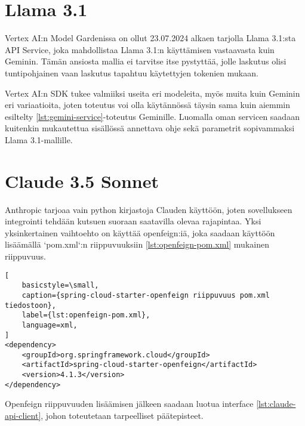 

\section{Llama 3.1}

Vertex AI:n Model Gardenissa on ollut 23.07.2024 alkaen tarjolla Llama 3.1:sta
API Service, joka mahdollistaa Llama 3.1:n käyttämisen vastaavasta kuin
Geminin. Tämän ansiosta mallia ei tarvitse itse pystyttää, jolle laskutus olisi
tuntipohjainen vaan laskutus tapahtuu käytettyjen tokenien mukaan.
\parencite{vertexAiModelGardenLlama3}

Vertex AI:n SDK tukee valmiiksi useita eri modeleita, myös muita kuin Geminin
eri variaatioita, joten toteutus voi olla käytännössä täysin sama kuin aiemmin
esiltelty \ref{lst:gemini-service}-toteutus Geminille. Luomalla oman servicen
saadaan kuitenkin mukautettua sisällössä annettava ohje sekä parametrit
sopivammaksi Llama 3.1-mallille.

\section{Claude 3.5 Sonnet}

Anthropic tarjoaa vain python kirjastoja Clauden käyttöön, joten sovellukseen
integrointi tehdään kutsuen suoraan saatavilla olevaa rajapintaa. Yksi
yksinkertainen vaihtoehto on käyttää openfeign:iä, joka saadaan käyttöön
lisäämällä `pom.xml`:n riippuvuuksiin \ref{lst:openfeign-pom.xml} mukainen
riippuvuus.

\begin{lstlisting}[
    basicstyle=\small,
    caption={spring-cloud-starter-openfeign riippuvuus pom.xml tiedostoon},
    label={lst:openfeign-pom.xml},
    language=xml,
]
<dependency>
    <groupId>org.springframework.cloud</groupId>
    <artifactId>spring-cloud-starter-openfeign</artifactId>
    <version>4.1.3</version>
</dependency>
\end{lstlisting}

Openfeign riippuvuuden lisäämisen jälkeen saadaan luotua interface
\ref{lst:claude-api-client}, johon toteutetaan tarpeelliset päätepisteet.



